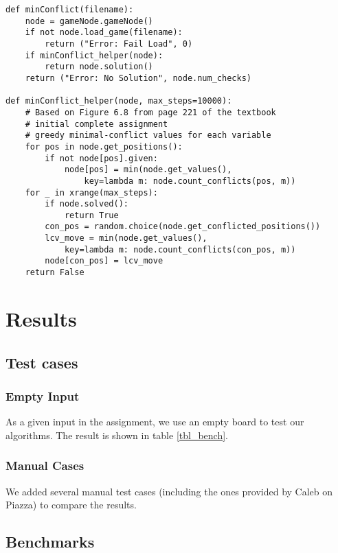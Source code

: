 \documentclass[11pt]{article}
\begin{document}
\lstset{language=Python}
\begin{lstlisting}[frame=single]
def minConflict(filename):
	node = gameNode.gameNode()
	if not node.load_game(filename):
		return ("Error: Fail Load", 0)
	if minConflict_helper(node):
		return node.solution()
	return ("Error: No Solution", node.num_checks)

def minConflict_helper(node, max_steps=10000):
	# Based on Figure 6.8 from page 221 of the textbook
	# initial complete assignment
	# greedy minimal-conflict values for each variable
	for pos in node.get_positions():
		if not node[pos].given:
			node[pos] = min(node.get_values(),
				key=lambda m: node.count_conflicts(pos, m))
	for _ in xrange(max_steps):
		if node.solved():
			return True
		con_pos = random.choice(node.get_conflicted_positions())
		lcv_move = min(node.get_values(),
			key=lambda m: node.count_conflicts(con_pos, m))
		node[con_pos] = lcv_move
	return False
\end{lstlisting}

\section{Results}

\subsection{Test cases}

\subsubsection{Empty Input}

As a given input in the assignment, we use an empty board to test our algorithms.
The result is shown in table \ref{tbl_bench}.

\subsubsection{Manual Cases}

We added several manual test cases (including the ones provided by Caleb on
Piazza) to compare the results.

\subsection{Benchmarks}
\end{document}
